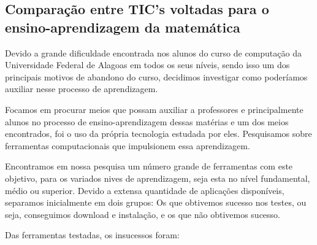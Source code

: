 \documentclass[12pt,a4paper]{article}
\begin{document}
\subsection{Comparação entre TIC’s voltadas para o ensino-aprendizagem da matemática}
Devido a grande dificuldade encontrada nos alunos do curso de computação da Universidade Federal de Alagoas em todos os seus níveis, sendo isso um dos principais motivos de abandono do curso, decidimos investigar como poderíamos auxiliar nesse processo de aprendizagem.

Focamos em procurar meios que possam auxiliar a professores e principalmente alunos no processo de ensino-aprendizagem dessas matérias e um dos meios encontrados, foi o uso da própria tecnologia estudada por eles. Pesquisamos sobre ferramentas computacionais que impulsionem essa aprendizagem.

Encontramos em nossa pesquisa um número grande de ferramentas com este objetivo, para os variados nives de aprendizagem, seja esta no nível fundamental, médio ou superior.   Devido a  extensa quantidade de aplicações disponíveis, separamos inicialmente em dois grupos: Os que  obtivemos sucesso nos testes, ou seja, conseguimos download e  instalação, e os que não obtivemos sucesso.

Das ferramentas testadas, os insucessos foram:
\end{document}
